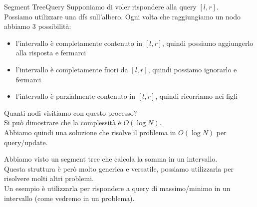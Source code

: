 \documentclass[compress]{beamer}
\begin{document}
\begin{frame}{Segment Tree}{Query}
    Supponiamo di voler rispondere alla query $[l, r]$.\\
    Possiamo utilizzare una dfs sull'albero. Ogni volta che raggiungiamo un nodo abbiamo $3$ possibilità:\\
    \pause
    \begin{itemize}
        \item l'intervallo è completamente contenuto in $[l, r]$, quindi possiamo aggiungerlo alla risposta e fermarci
        \item l'intervallo è completamente fuori da $[l, r]$, quindi possiamo ignorarlo e fermarci
        \item l'intervallo è parzialmente contenuto in $[l, r]$, quindi ricorriamo nei figli
    \end{itemize}
    \pause
    Quanti nodi visitiamo con questo processo?\\
    \pause
    Si può dimostrare che la complessità è $O(\log N)$.\\
    Abbiamo quindi una soluzione che risolve il problema in $O(\log N)$ per query/update.
\end{frame}

\begin{frame}
\end{frame}

\begin{frame}
    Abbiamo visto un segment tree che calcola la somma in un intervallo.\\
    Questa struttura è però molto generica e versatile, possiamo utilizzarla per risolvere molti altri problemi.\\
    \pause
    Un esempio è utilizzarla per rispondere a query di massimo/minimo in un intervallo (come vedremo in un problema).\\
\end{frame}
\end{document}
